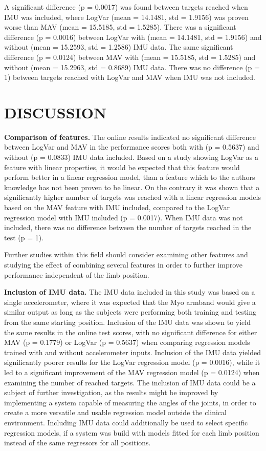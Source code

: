 \documentclass[a4paper, 10pt, conference]{ieeeconf}      %
\begin{document}
\begin{multicol}{2}
	A significant difference (p = 0.0017) was found between targets reached when IMU was included, where LogVar (mean = 14.1481, std = 1.9156) was proven worse than MAV (mean = 15.5185, std = 1.5285). There was a significant difference (p = 0.0016) between LogVar with (mean = 14.1481, std = 1.9156) and without (mean = 15.2593, std = 1.2586) IMU data. The same significant difference (p = 0.0124) between MAV with (mean = 15.5185, std = 1.5285) and without (mean = 15.2963, std = 0.8689) IMU data. There was no difference (p = 1) between targets reached with LogVar and MAV when IMU was not included.
	
\section{DISCUSSION}%
	
%		
\textbf{Comparison of features.}
The online results indicated no significant difference between LogVar and MAV in the performance scores both with (p = 0.5637) and without (p = 0.0833) IMU data included. Based on a study \cite{hahne2014} showing LogVar as a feature with linear properties, it would be expected that this feature would perform better in a linear regression model, than a feature which to the authors knowledge has not been proven to be linear. On the contrary it was shown that a significantly higher number of targets was reached with a linear regression models based on the MAV feature with IMU included, compared to the LogVar regression model with IMU included (p = 0.0017). When IMU data was not included, there was no difference between the number of targets reached in the test (p = 1).

Further studies within this field should consider examining other features and studying the effect of combining several features in order to further improve performance independent of the limb position.

\textbf{Inclusion of IMU data.}
The IMU data included in this study was based on a single accelerometer, where it was expected that the Myo armband would give a similar output as long as the subjects were performing both training and testing from the same starting position. Inclusion of the IMU data was shown to yield the same results in the online test scores, with no significant difference for either MAV (p = 0.1779) or LogVar (p = 0.5637) when comparing regression models trained with and without accelerometer inputs. Inclusion of the IMU data yielded significantly poorer results for the LogVar regression model (p = 0.0016), while it led to a significant improvement of the MAV regression model (p = 0.0124) when examining the number of reached targets. The inclusion of IMU data could be a subject of further investigation, as the results might be improved by implementing a system capable of measuring the angles of the joints, in order to create a more versatile and usable regression model outside the clinical environment. Including IMU data could additionally be used to select specific regression models, if a system was build with models fitted for each limb position instead of the same regressors for all positions. 


\end{multicol}
\end{document}
